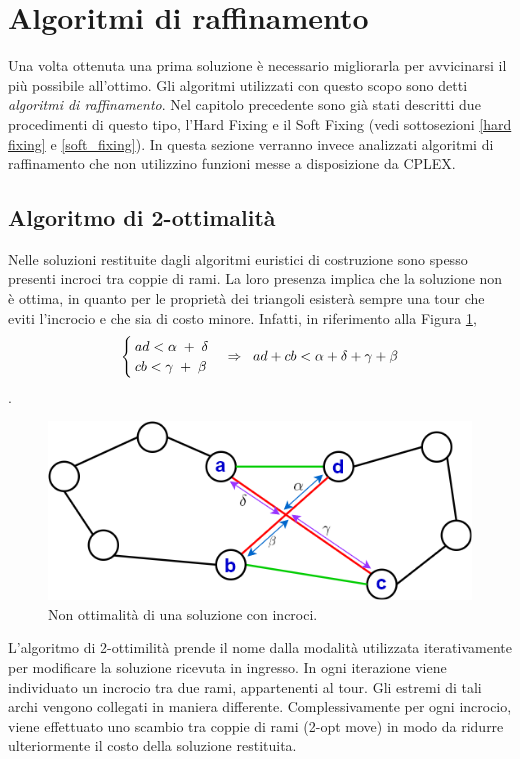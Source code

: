 \section{Algoritmi di raffinamento}
Una volta ottenuta una prima soluzione è necessario migliorarla per avvicinarsi il più possibile all'ottimo. Gli algoritmi utilizzati con questo scopo sono detti \textit{algoritmi di raffinamento}. Nel capitolo precedente sono già stati descritti due procedimenti di questo tipo, l'Hard Fixing e il Soft Fixing (vedi sottosezioni \ref{hard fixing} e \ref{soft_fixing}). In questa sezione verranno invece analizzati algoritmi di raffinamento che non utilizzino funzioni messe a disposizione da CPLEX.

\subsection{Algoritmo di 2-ottimalità}
Nelle soluzioni restituite dagli algoritmi euristici di costruzione sono spesso presenti incroci tra coppie di rami. La loro presenza implica che la soluzione non è ottima, in quanto per le proprietà dei triangoli esisterà sempre una tour che eviti l'incrocio e che sia di costo minore. Infatti, in riferimento alla Figura \ref{cross},
\begin{equation}
\begin{cases}
ad < \alpha \;+\; \delta \\ \notag
cb < \gamma \;+\; \beta
\end{cases} 
\Rightarrow
\;\;ad+cb<\alpha + \delta +\gamma + \beta
\end{equation}. 
\begin{figure}[H] 
\begin{center} 
  \includegraphics[scale=0.5]{Images/triangle_property}
  \caption{\footnotesize{Non ottimalità di una soluzione con incroci.}}
  \label{cross}
\end{center}
\end{figure}
L'algoritmo di 2-ottimilità prende il nome dalla modalità utilizzata iterativamente per modificare la soluzione ricevuta in ingresso. In ogni iterazione viene individuato un incrocio tra due rami, appartenenti al tour. Gli estremi di tali archi vengono collegati in maniera differente. Complessivamente per ogni incrocio, viene effettuato uno scambio tra coppie di rami (2-opt move) in modo da ridurre ulteriormente il costo della soluzione restituita.\\

